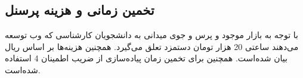 \subsection* {تخمین زمانی و هزینه پرسنل}
با توجه به بازار موجود و پرس و جوی میدانی به دانشجویان کارشناسی که وب توسعه می‌دهند ساعتی 20 هزار تومان دستمزد تعلق می‌گیرد. همچنین هزینه‌ها بر اساس ریال بیان شده‌است. همچنین برای تخمین زمان پیاده‌سازی از ضریب اطمینان 4 استفاده شده‌است.
\begin{table}[h!]
\centering
{}
\end{table}